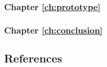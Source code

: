 \begin{refsection}
\begin{multicols}{2}
        \subsubsection*{Chapter \ref{ch:prototype}}
        \lipsum[10]
        \subsubsection*{Chapter \ref{ch:conclusion}}
        \lipsum[11]

        \subsection*{References}
        \printbibliography

    \end{multicols}
\end{refsection}

\restoregeometry